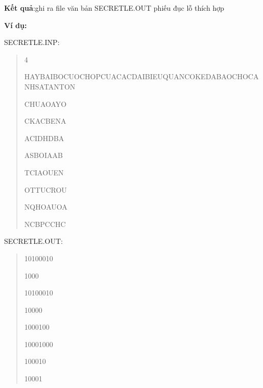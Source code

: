 \textbf{Kết quả}:ghi ra file văn bản SECRETLE.OUT phiếu đục lỗ thích hợp

\textbf{Ví dụ:}

SECRETLE.INP:
\begin{quotation}

4

HAYBAIBOCUOCHOPCUACACDAIBIEUQUANCOKEDABAOCHOCANHSATANTON

CHUAOAYO

CKACBENA

ACIDHDBA

ASBOIAAB

TCIAOUEN

OTTUCROU

NQHOAUOA

NCBPCCHC
\end{quotation}

SECRETLE.OUT:
\begin{quotation}

10100010

1000

10100010

10000

1000100

10001000

100010

10001
\end{quotation}
